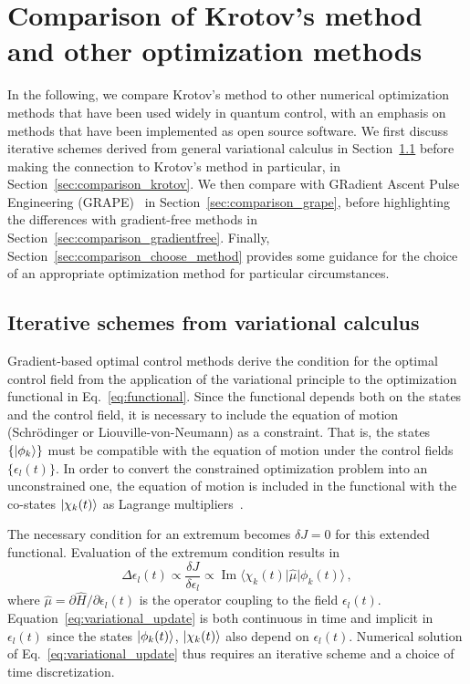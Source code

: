 \documentclass[submission, Phys]{SciPost}
\newcommand{\Op}[1]{\hat{#1}}
\renewcommand{\Im}[0]{\operatorname{Im}}
\begin{document}
\section{Comparison of Krotov's method and other optimization methods}%
\label{sec:comparison}

In the following, we compare Krotov's method to other numerical optimization
methods that have been used widely in quantum control, with an emphasis on
methods that have been implemented as open source software.
We first discuss iterative schemes derived from general variational calculus in
Section~\ref{sec:comparison_variational_calculus} before making the connection
to Krotov's method in particular, in Section~\ref{sec:comparison_krotov}.
We then compare with GRadient Ascent Pulse Engineering
(GRAPE)~\cite{GlaserEPJD2015,KhanejaJMR05} in
Section~\ref{sec:comparison_grape}, before highlighting the differences with
gradient-free methods in Section~\ref{sec:comparison_gradientfree}.
Finally, Section~\ref{sec:comparison_choose_method} provides some guidance for
the choice of an appropriate optimization method for particular circumstances.


\subsection{Iterative schemes from variational calculus}
\label{sec:comparison_variational_calculus}

Gradient-based optimal control methods derive the condition for the optimal
control field from the application of the variational principle to the
optimization functional in Eq.~\eqref{eq:functional}.
Since the functional depends both on the states and the control field, it is
necessary to include the equation of motion (Schrödinger or
Liouville-von-Neumann) as a constraint.
That is, the states $\{\ket{\phi_k}\}$ must be compatible with the equation of
motion under the control fields $\{\epsilon_l(t)\}$.
In order to convert the constrained optimization problem into an unconstrained
one, the equation of motion is included in the functional with the co-states
$\ket{\chi_k(t)}$ as  Lagrange
multipliers~\cite{KosloffCP1989,ShiJCP1990,ShiCPC1991,Tannor91}.

The necessary condition for an extremum becomes $\delta J = 0$ for this extended
functional.
Evaluation of the extremum condition results in~\cite{Tannor91}
\begin{equation}
  \label{eq:variational_update}
  \Delta \epsilon_l(t) \propto \frac{\delta J}{\delta \epsilon_l} \propto
    \Im \big\langle
    \chi_k(t)
    \big\vert
    \Op{\mu}
    \big\vert
    \phi_k(t)
    \big\rangle\,,
\end{equation}
where $\Op{\mu} = \partial \Op{H} / \partial \epsilon_l(t)$ is the operator coupling
to the field $\epsilon_l(t)$.
Equation~\eqref{eq:variational_update} is both continuous in time and implicit
in $\epsilon_l(t)$ since the states $\ket{\phi_k(t)}$, $\ket{\chi_k(t)}$ also
depend on $\epsilon_l(t)$.
Numerical solution of Eq.~\eqref{eq:variational_update} thus requires an
iterative scheme and a choice of time discretization.
\end{document}
